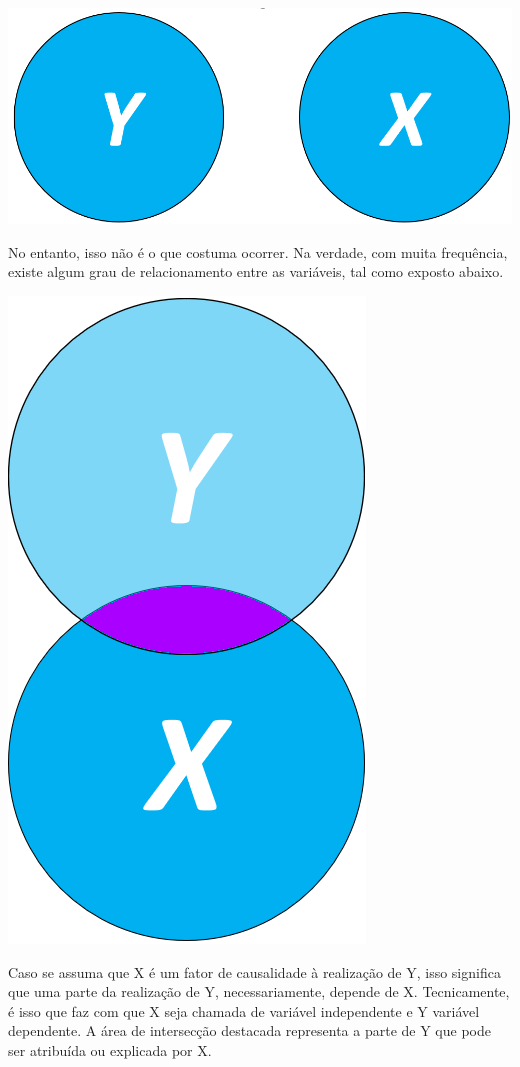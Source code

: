 \documentclass[
]{book}
\begin{document}
\includegraphics{./img/cap_reg_xy.png}

No entanto, isso não é o que costuma ocorrer. Na verdade, com muita frequência, existe algum grau de relacionamento entre as variáveis, tal como exposto abaixo.

\includegraphics{./img/cap_reg_x_y2.png}

Caso se assuma que X é um fator de causalidade à realização de Y, isso significa que uma parte da realização de Y, necessariamente, depende de X. Tecnicamente, é isso que faz com que X seja chamada de variável independente e Y variável dependente. A área de intersecção destacada representa a parte de Y que pode ser atribuída ou explicada por X.
\end{document}
